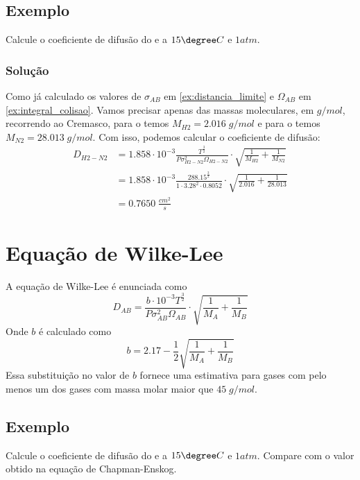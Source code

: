 \subsection{Exemplo}
Calcule o coeficiente de difusão do  e  a \(15\degree C\) e \(1 atm\).
\subsubsection{Solução}
Como já calculado os valores de \(\sigma_{AB} \) em \ref{ex:distancia_limite} e \(\Omega_{AB}\) em
\ref{ex:integral_colisao}. Vamos precisar apenas das massas moleculares, em \(g/mol\), recorrendo ao
Cremasco, para o  temos \(M_{H2} = 2.016 \; g/mol\) e para o  temos \(M_{N2} = 28.013
\; g/mol\). Com isso, podemos calcular o coeficiente de difusão:
\begin{align}
    D_{H2-N2} &= 1.858 \cdot 10^{-3} \frac{T^{\frac{3}{2}} }{P \sigma_{H2-N2}^{2} \Omega_{H2-N2}} \cdot \sqrt{\frac{1}{M_{H2}} + \frac{1}{M_{N2} }} \\
    &= 1.858 \cdot 10^{-3} \frac{288.15^{\frac{3}{2}} }{1 \cdot 3.28^{2} \cdot 0.8052} \cdot \sqrt{\frac{1}{2.016} + \frac{1}{28.013} } \\
    &= 0.7650 \; \frac{cm^2}{s}
\end{align}

\section{Equação de Wilke-Lee}
A equação de Wilke-Lee é enunciada como
\begin{equation}\label{eq:wilke-lee}
    D_{AB} = \frac{b \cdot 10^{-3} T^{\frac{3}{2}}  }{P \sigma_{AB}^{2} \Omega_{AB}} \cdot \sqrt{\frac{1}{M_A} + \frac{1}{M_{B} }}
\end{equation}
Onde \(b\) é calculado como
\begin{equation}\label{eq:termo_extra_b}
    b = 2.17 - \frac{1}{2} \sqrt{\frac{1}{M_A} + \frac{1}{M_{B} }}
\end{equation}
Essa substituição no valor de \(b\) fornece uma estimativa para gases com pelo menos um dos gases
com massa molar maior que \(45 \; g/mol\).
\subsection{Exemplo}
Calcule o coeficiente de difusão do  e  a \(15\degree C\) e \(1 atm\). Compare com o
valor obtido na equação de Chapman-Enskog.
